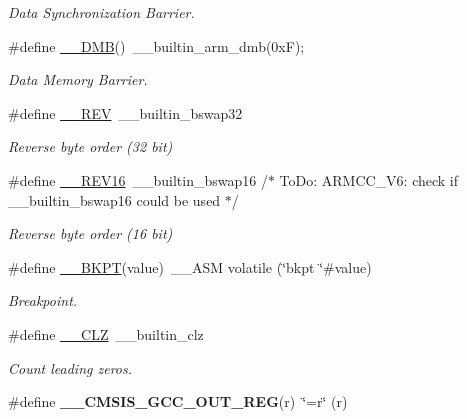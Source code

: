 \begin{DoxyCompactItemize}
\begin{DoxyCompactList}\small\item\em Data Synchronization Barrier. \end{DoxyCompactList}\item 
\#define \hyperlink{group___c_m_s_i_s___core___instruction_interface_ga671101179b5943990785f36f8c1e2269}{\-\_\-\-\_\-\-D\-M\-B}()~\-\_\-\-\_\-builtin\-\_\-arm\-\_\-dmb(0x\-F);
\begin{DoxyCompactList}\small\item\em Data Memory Barrier. \end{DoxyCompactList}\item 
\#define \hyperlink{group___c_m_s_i_s___core___instruction_interface_ga14f54807872c0f5e05604c4924abfdae}{\-\_\-\-\_\-\-R\-E\-V}~\-\_\-\-\_\-builtin\-\_\-bswap32
\begin{DoxyCompactList}\small\item\em Reverse byte order (32 bit) \end{DoxyCompactList}\item 
\#define \hyperlink{group___c_m_s_i_s___core___instruction_interface_ga4e3acd41e7667cdf65ffcd8c76a8613f}{\-\_\-\-\_\-\-R\-E\-V16}~\-\_\-\-\_\-builtin\-\_\-bswap16                           /$\ast$ To\-Do\-:  A\-R\-M\-C\-C\-\_\-\-V6\-: check if \-\_\-\-\_\-builtin\-\_\-bswap16 could be used $\ast$/
\begin{DoxyCompactList}\small\item\em Reverse byte order (16 bit) \end{DoxyCompactList}\item 
\#define \hyperlink{group___c_m_s_i_s___core___instruction_interface_ga15ea6bd3c507d3e81c3b3a1258e46397}{\-\_\-\-\_\-\-B\-K\-P\-T}(value)~\-\_\-\-\_\-\-A\-S\-M volatile (\char`\"{}bkpt \char`\"{}\#value)
\begin{DoxyCompactList}\small\item\em Breakpoint. \end{DoxyCompactList}\item 
\#define \hyperlink{group___c_m_s_i_s___core___instruction_interface_ga5d5bb1527e042be4a9fa5a33f65cc248}{\-\_\-\-\_\-\-C\-L\-Z}~\-\_\-\-\_\-builtin\-\_\-clz
\begin{DoxyCompactList}\small\item\em Count leading zeros. \end{DoxyCompactList}\item 
\hypertarget{group___c_m_s_i_s___core___instruction_interface_gabc17e391c13c71702366c67cba39c276}{\#define {\bfseries \-\_\-\-\_\-\-C\-M\-S\-I\-S\-\_\-\-G\-C\-C\-\_\-\-O\-U\-T\-\_\-\-R\-E\-G}(r)~\char`\"{}=r\char`\"{} (r)}\label{group___c_m_s_i_s___core___instruction_interface_gabc17e391c13c71702366c67cba39c276}


\end{DoxyCompactItemize}
